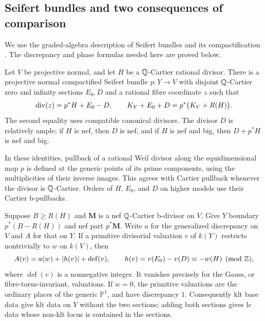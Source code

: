 \subsection{Seifert bundles and two consequences of comparison}

We use the graded-algebra description of Seifert bundles and its
compactification \cite[Definition~5, Theorem~7 and Section~14]{KollarSeifert}.
The discrepancy and phase formulas needed here are proved below.

\begin{lemma}\label{lem:B-seifert}
Let $V$ be projective normal, and let $H$ be a $\mathbb Q$-Cartier rational
divisor.  There is a projective normal compactified Seifert bundle
$p:Y\to V$ with disjoint $\mathbb Q$-Cartier zero and infinity sections
$E_0,D$ and a rational fibre coordinate $z$ such that
\begin{equation}\label{eq:B-bundle-identities}
 \operatorname{div}(z)=p^*H+E_0-D,
 \qquad
 K_Y+E_0+D=p^*\bigl(K_V+R(H)\bigr).
\end{equation}
The second equality uses compatible canonical divisors.  The divisor
$D$ is relatively ample; if $H$ is nef, then $D$ is nef, and if $H$
is nef and big, then $D+p^*H$ is nef and big.

In these identities, pullback of a rational Weil divisor along the
equidimensional map $p$ is defined at the generic points of its prime
components, using the multiplicities of their inverse images.  This
agrees with Cartier pullback whenever the divisor is $\mathbb Q$-Cartier.
Orders of $H$, $E_0$, and $D$ on higher models use their Cartier
b-pullbacks.

Suppose $B\ge R(H)$ and $\mathbf M$ is a nef $\mathbb Q$-Cartier
b-divisor on $V$.  Give $Y$ boundary $p^*(B-R(H))$ and nef part
$p^*\mathbf M$.  Write $a$ for the generalized discrepancy on $V$
and $A$ for that on $Y$.  If a primitive divisorial valuation $v$ of
$k(Y)$ restricts nontrivially to $w$ on $k(V)$, then
\begin{equation}\label{eq:B-bundle-discrepancy}
 A(v)=a(w)+|h(v)|+\operatorname{def}(v),
 \qquad
 h(v)=v(E_0)-v(D)\equiv-w(H)\pmod{\mathbb Z},
\end{equation}
where $\operatorname{def}(v)$ is a nonnegative integer.  It vanishes
precisely for the Gauss, or fibre-torus-invariant, valuations.
If $w=0$, the primitive valuations are the ordinary places of the
generic $\mathbb P^1$, and have discrepancy $1$.
Consequently klt base data give klt data on $Y$ without the two
sections; adding both sections gives lc data whose non-klt locus is
contained in the sections.
\end{lemma}

